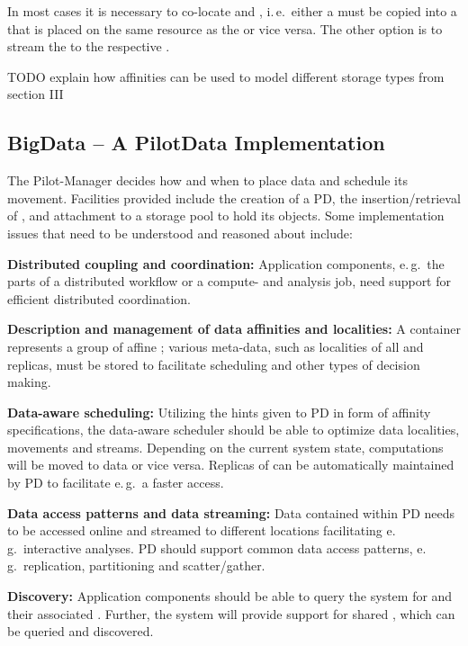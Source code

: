 \documentclass[conference]{IEEEtran}
\begin{document}
In most cases it is necessary to co-locate \cus and \dus, i.\,e.\ either a \du
must be copied into a \pd that is placed on the same resource as the \pj or
vice versa. The other option is to stream the \du to the respective \cu.

TODO
explain how affinities can be used to model different storage types from section III



\subsection{BigData -- A PilotData Implementation}


The Pilot-Manager decides how and when to place data and
schedule its movement. Facilities provided include the creation of a
PD, the insertion/retrieval of \dataunits, and attachment to a storage
pool to hold its objects. Some implementation issues that need to be
understood and reasoned about include:


\begin{compactitem}
\item \textbf{Distributed coupling and coordination:} Application
  components, e.\,g.\ the parts of a distributed workflow or a
  compute- and analysis job, need support for efficient distributed
  coordination.
\item \textbf{Description and management of data affinities and
    localities:} A \pd container represents a group of affine
  \dataunits; %
  various meta-data, such as localities of all \dataunits and
  replicas, must be stored to facilitate scheduling and other types of
  decision making.
\item \textbf{Data-aware scheduling:} Utilizing the hints given to PD
  in form of affinity specifications, the data-aware scheduler should
  be able to optimize data localities, movements and
  streams. Depending on the current system state, computations will be
  moved to data or vice versa. Replicas of \dataunits can be
  automatically maintained by PD to facilitate e.\,g.\ a faster
  access.
\item \textbf{Data access patterns and data streaming:} Data contained
  within PD needs to be accessed online and streamed to different
  locations facilitating e.\,g.\ interactive analyses.  PD should
  support common data access patterns, e.\,g.\ replication,
  partitioning and scatter/gather.
\item \textbf{Discovery:} Application components should be able to
  query the system for \dataunits and their associated
  \pilots. Further, the system will provide support for shared \dus,
  which can be queried and discovered.
\end{compactitem}
\end{document}
